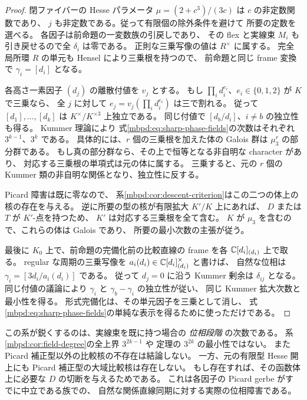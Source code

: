\begin{proof}
閉ファイバーの Hesse パラメータ
$\mu=(2+c^3)/(3c)$ は $c$ の非定数関数であり、
$j$ も非定数である。従って有限個の除外条件を避けて
所要の定数を選べる。
各因子は前命題の一変数族の引戻しであり、
その flex と実線束 $M_i$ も引き戻せるので全 $\delta_i$ は零である。
正則な三乗写像の値は $R^\times$ に属する。
完全局所環 $R$ の単元も Hensel により三乗根を持つので、
前命題と同じ frame 変換で $\gamma_i=[d_i]$ となる。

各高さ一素因子 $(d_j)$ の離散付値を $v_j$ とする。
もし $\prod_i d_i^{e_i}$、$e_i\in\{0,1,2\}$ が $K$ で三乗なら、
全 $j$ に対して $e_j=v_j(\prod_i d_i^{e_i})$ は三で割れる。
従って $[d_1],\ldots,[d_k]$ は $K^\times/K^{\times3}$ 上独立である。
同じ付値で $[d_b/d_i]$、$i\ne b$ の独立性も得る。
Kummer 理論\cite{NFMStacksKummer}により
式\eqref{mbpd:eq:sharp-phase-fields}の次数はそれぞれ
$3^{k-1}$、$3^k$ である。
具体的には、$r$ 個の三乗根を加えた体の Galois 群は $\mu_3^r$ の部分群である。
もし真の部分群なら、その上で恒等となる非自明な character があり、
対応する三乗根の単項式は元の体に属する。
三乗すると、元の $r$ 個の Kummer 類の非自明な関係となり、独立性に反する。

Picard 障害は既に零なので、
系\ref{mbpd:cor:descent-criterion}はこの二つの体上の核の存在を与える。
逆に所要の型の核が有限拡大 $K'/K$ 上にあれば、
$D$ または $T$ が $K'$-点を持つため、
$K'$ は対応する三乗根を全て含む。
$K$ が $\mu_3$ を含むので、これらの体は Galois であり、
所要の最小次数の主張が従う。

最後に $K_0$ 上で、前命題の完備化前の比較直線の frame を各
$\mathbb C[d_i]_{(d_i)}$ 上で取る。
regular な周期の三乗写像を $a_i(d_i)\in\mathbb C[d_i]_{(d_i)}^\times$ と書けば、
自然な位相は
$\gamma_i=[3d_i/a_i(d_i)]$ である。
従って $d_j=0$ に沿う Kummer 剰余は $\delta_{ij}$ となる。
同じ付値の議論により $\gamma_i$ と $\gamma_b-\gamma_i$ の独立性が従い、
同じ Kummer 拡大次数と最小性を得る。
形式完備化は、その単元因子を三乗として消し、
式\eqref{mbpd:eq:sharp-phase-fields}の単純な表示を得るために使っただけである。
\end{proof}

この系が鋭くするのは、実線束を既に持つ場合の \emph{位相段階} の次数である。
系\ref{mbpd:cor:field-degree}の全上界 $3^{2k-1}$ や
定理の $3^{2k}$ の最小性ではない。
また Picard 補正型以外の比較核の不存在は結論しない。
一方、元の有限型 Hesse 開上にも Picard 補正型の大域比較核は存在しない。
もし存在すれば、その函数体上に必要な $D$ の切断を与えるためである。
これは各因子の Picard gerbe がすでに中立である族での、
自然な関係直線同期に対する実際の位相障害である。

